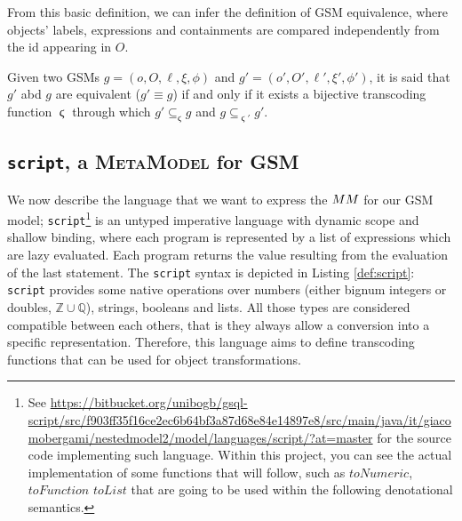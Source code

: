 From this basic definition, we can infer the definition of GSM equivalence, where objects' labels, expressions and containments are compared independently from the id appearing in $O$.

\begin{definition}
	Given two GSMs $g=(o,O,\ell,\xi,\phi)$ and $g'=(o',O',\ell',\xi',\phi')$, it is said that $g'$ abd $g$ are equivalent ($g'\equiv g$) if and only if it
	exists a bijective transcoding function $\stigma$ through which $g'\subseteq_\stigma g$ and $g\subseteq_{\stigma'}g'$.
\end{definition}

\subsection{\texttt{script}, a \textsc{MetaModel} for GSM}\label{sec:scriptEll}
We now describe the language that we want to express the $\metamodel$ for our GSM model; \texttt{script}\footnote{See \url{https://bitbucket.org/unibogb/gsql-script/src/f903ff35f16ce2ec6b64bf3a87d68e84e14897e8/src/main/java/it/giacomobergami/nestedmodel2/model/languages/script/?at=master} for the source code implementing such language. Within this project, you can see the actual implementation of some functions that will follow, such as $toNumeric$, $toFunction$ $toList$ that are going to be used within the following denotational semantics.} is an untyped imperative language with dynamic scope and shallow binding, where each program is represented by a list of expressions which are lazy evaluated. Each program returns the value  resulting from the evaluation of the last statement. The \texttt{script} syntax is depicted in Listing \vref{def:script}: \texttt{script} provides some native operations over numbers (either bignum integers or doubles, $\mathbb{Z}\cup\mathbb{Q}$), strings, booleans and lists. All those types are considered compatible between each others, that is they always allow a conversion into a specific representation. Therefore, this language aims to define transcoding functions that can be used for object transformations.



